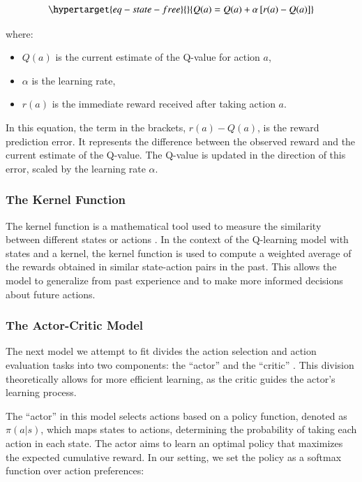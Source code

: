 \documentclass[
  number,
  preprint,
  3p,
  onecolumn]{elsarticle}
\begin{document}
\begin{equation}\protect\hypertarget{eq-state-free}{}{
Q(a) = Q(a) + \alpha \left[ r(a) - Q(a) \right]
}\label{eq-state-free}\end{equation}

where:

\begin{itemize}
\item
  \(Q(a)\) is the current estimate of the Q-value for action \(a\),
\item
  \(\alpha\) is the learning rate,
\item
  \(r(a)\) is the immediate reward received after taking action \(a\).
\end{itemize}

In this equation, the term in the brackets, \(r(a) - Q(a)\), is the
reward prediction error. It represents the difference between the
observed reward and the current estimate of the Q-value. The Q-value is
updated in the direction of this error, scaled by the learning rate
\(\alpha\).

\hypertarget{the-kernel-function}{%
\subsubsection{The Kernel Function}\label{the-kernel-function}}

The kernel function is a mathematical tool used to measure the
similarity between different states or actions
\citep{ormoneit2002, domingues, liu}. In the context of the Q-learning
model with states and a kernel, the kernel function is used to compute a
weighted average of the rewards obtained in similar state-action pairs
in the past. This allows the model to generalize from past experience
and to make more informed decisions about future actions.

\hypertarget{the-actor-critic-model}{%
\subsubsection{The Actor-Critic Model}\label{the-actor-critic-model}}

The next model we attempt to fit divides the action selection and action
evaluation tasks into two components: the ``actor'' and the ``critic''
\citep{sutton2018b}. This division theoretically allows for more
efficient learning, as the critic guides the actor's learning process.

The ``actor'' in this model selects actions based on a policy function,
denoted as \(\pi(a|s)\), which maps states to actions, determining the
probability of taking each action in each state. The actor aims to learn
an optimal policy that maximizes the expected cumulative reward. In our
setting, we set the policy as a softmax function over action
preferences:
\end{document}
